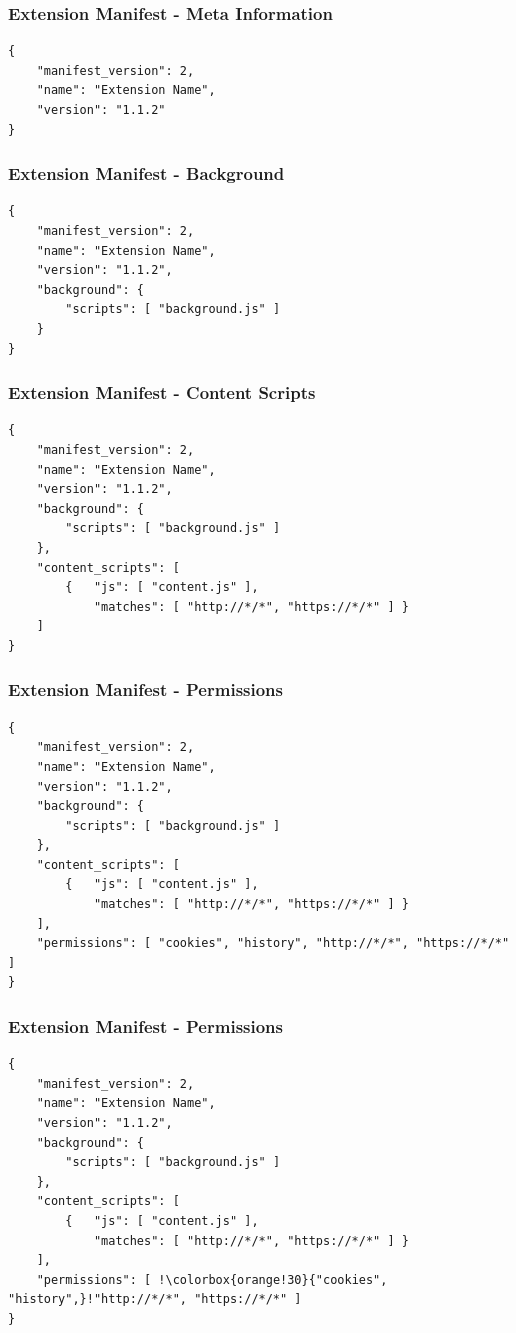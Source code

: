 \documentclass[accentcolor=tud9c,colorbacktitle,xcolor=dvipsnames]{tudbeamer}
\newcommand{\highlight}[4]{%
	\ifnum\value{lstnumber}=#1\color{orange!30}\fi%
	\ifnum\value{lstnumber}=#2\color{orange!30}\fi%
	\ifnum\value{lstnumber}=#3\color{orange!30}\fi%
	\ifnum\value{lstnumber}=#4\color{orange!30}\fi%
}
\begin{document}
\begin{frame}[fragile]
	\frametitle{Extension Manifest - Meta Information}
	\begin{lstlisting}[linebackgroundcolor={\highlight{2}{3}{4}{0}}]
{
	"manifest_version": 2,
	"name": "Extension Name",
	"version": "1.1.2"	
}
\end{lstlisting}
\end{frame}

\begin{frame}[fragile]
	\frametitle{Extension Manifest - Background}
	\begin{lstlisting}[linebackgroundcolor={\highlight{5}{6}{7}{0}}]
{
	"manifest_version": 2,
	"name": "Extension Name",
	"version": "1.1.2",
	"background": {
		"scripts": [ "background.js" ]
	}
}
\end{lstlisting}
\end{frame}

\begin{frame}[fragile]
	\frametitle{Extension Manifest - Content Scripts}
	\begin{lstlisting}[linebackgroundcolor={\highlight{8}{9}{10}{11}}]
{
	"manifest_version": 2,
	"name": "Extension Name",
	"version": "1.1.2",
	"background": {
		"scripts": [ "background.js" ]
	},
	"content_scripts": [
		{ 	"js": [ "content.js" ],
			"matches": [ "http://*/*", "https://*/*" ] }
	]
}
\end{lstlisting}
\end{frame}

\begin{frame}[fragile]
	\frametitle{Extension Manifest - Permissions}
	\begin{lstlisting}[linebackgroundcolor={\highlight{12}{0}{0}{0}}]
{
	"manifest_version": 2,
	"name": "Extension Name",
	"version": "1.1.2",
	"background": {
		"scripts": [ "background.js" ]
	},
	"content_scripts": [
		{ 	"js": [ "content.js" ],
			"matches": [ "http://*/*", "https://*/*" ] }
	],
	"permissions": [ "cookies", "history", "http://*/*", "https://*/*" ]
}
\end{lstlisting}
\end{frame}

\begin{frame}[fragile]
	\frametitle{Extension Manifest - Permissions}
	\begin{lstlisting}
{
	"manifest_version": 2,
	"name": "Extension Name",
	"version": "1.1.2",
	"background": {
		"scripts": [ "background.js" ]
	},
	"content_scripts": [
		{ 	"js": [ "content.js" ],
			"matches": [ "http://*/*", "https://*/*" ] }
	],
	"permissions": [ !\colorbox{orange!30}{"cookies", "history",}!"http://*/*", "https://*/*" ]
}
\end{lstlisting}
\end{frame}
\end{document}
